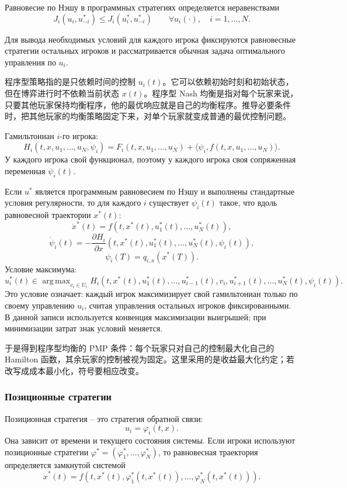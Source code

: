 \documentclass[12pt,a4paper]{article}
\DeclareMathOperator*{\argmax}{arg\,max}
\newcommand{\zh}[1]{\par\noindent #1\par}
\begin{document}
Равновесие по Нэшу в программных стратегиях определяется неравенствами
\[
 J_i(u_i,u_{-i}^*)\le J_i(u_i^*,u_{-i}^*)
 \qquad \forall u_i(\cdot),\quad i=1,\ldots,N.
\]

Для вывода необходимых условий для каждого игрока фиксируются равновесные стратегии остальных игроков и рассматривается обычная задача оптимального управления по $u_i$.
\zh{程序型策略指的是只依赖时间的控制 \(u_i(t)\)。它可以依赖初始时刻和初始状态，但在博弈进行时不依赖当前状态 \(x(t)\)。程序型 Nash 均衡是指对每个玩家来说，只要其他玩家保持均衡程序，他的最优响应就是自己的均衡程序。推导必要条件时，把其他玩家的均衡策略固定下来，对单个玩家就变成普通的最优控制问题。}

Гамильтониан $i$-го игрока:
\[
 H_i(t,x,u_1,\ldots,u_N,\psi_i)=F_i(t,x,u_1,\ldots,u_N)+\langle\psi_i,f(t,x,u_1,\ldots,u_N)\rangle.
\]
У каждого игрока свой функционал, поэтому у каждого игрока своя сопряженная переменная $\psi_i(t)$.

Если $u^*$ является программным равновесием по Нэшу и выполнены стандартные условия регулярности, то для каждого $i$ существует $\psi_i(t)$ такое, что вдоль равновесной траектории $x^*(t)$:
\[
 \dot x^*(t)=f(t,x^*(t),u_1^*(t),\ldots,u_N^*(t)),
\]
\[
 \dot\psi_i(t)=-\frac{\partial H_i}{\partial x}(t,x^*(t),u_1^*(t),\ldots,u_N^*(t),\psi_i(t)),
\]
\[
 \psi_i(T)=q_{i,x}(x^*(T)).
\]
Условие максимума:
\[
 u_i^*(t)\in\argmax_{v_i\in U_i}H_i(t,x^*(t),u_1^*(t),\ldots,u_{i-1}^*(t),v_i,u_{i+1}^*(t),\ldots,u_N^*(t),\psi_i(t)).
\]
Это условие означает: каждый игрок максимизирует свой гамильтониан только по своему управлению $u_i$, считая управления остальных игроков фиксированными. В данной записи используется конвенция максимизации выигрышей; при минимизации затрат знак условий меняется.
\zh{于是得到程序型均衡的 PMP 条件：每个玩家只对自己的控制最大化自己的 Hamilton 函数，其余玩家的控制被视为固定。这里采用的是收益最大化约定；若改写成成本最小化，符号要相应改变。}

\subsubsection{Позиционные стратегии}

Позиционная стратегия -- это стратегия обратной связи:
\[
 u_i=\varphi_i(t,x).
\]
Она зависит от времени и текущего состояния системы. Если игроки используют позиционные стратегии $\varphi^*=(\varphi_1^*,\ldots,\varphi_N^*)$, то равновесная траектория определяется замкнутой системой
\[
 \dot x^*(t)=f(t,x^*(t),\varphi_1^*(t,x^*(t)),\ldots,\varphi_N^*(t,x^*(t))).
\]
\end{document}
